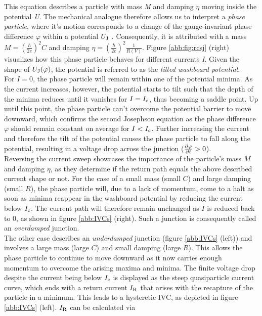 This equation describes a particle with mass \textit{M} and damping $\eta$ moving inside the potential \textit{U}. The mechanical analogue therefore allows us to interpret a \textit{phase particle}, where it's motion corresponds to a change of the gauge-invariant phase difference $\varphi$ within a potential $U_{\rm J}$ \cite{Clarke2004}. Consequently, it is attributed with a mass $M=\left(\frac{\hbar}{2 e}\right)^2C$ and damping $\eta=\left(\frac{\hbar}{2 e}\right)^2\frac{1}{R(V)}$. Figure \ref{abb:fig:rcsj} (right) visualizes how this phase particle behaves for different currents \textit{I}. Given the shape of $U_{\rm J}(\varphi)$, the potential is referred to as the \textit{tilted washboard potential}. \\
For $I=0$, the phase particle will remain within one of the potential minima. As the current increases, however, the potential starts to tilt such that the depth of the minima reduces until it vanishes for $I=I_{\rm c}$, thus becoming a saddle point. Up until this point, the phase particle can't overcome the potential barrier to move downward, which confirms the second Josephson equation as the phase difference $\varphi$ should remain constant on average for $I<I_{\rm c}$. Further increasing the current and therefore the tilt of the potential causes the phase particle to fall along the potential, resulting in a voltage drop across the junction ($\frac{\partial\varphi}{\partial t}>0$). \\

Reversing the current sweep showcases the importance of the particle's mass $M$ and damping $\eta$, as they determine if the return path equals the above described current shape or not. For the case of a small mass (small $C$) and large damping (small $R$), the phase particle will, due to a lack of momentum, come to a halt as soon as minima reappear in the washboard potential by reducing the current below $I_{\rm c}$. The current path will therefore remain unchanged as $I$ is reduced back to 0, as shown in figure \ref{abb:IVCs} (right). Such a junction is consequently called an \textit{overdamped} junction. \\
The other case describes an \textit{underdamped} junction (figure \ref{abb:IVCs} (left)) and involves a large mass (large $C$) and small damping (large $R$). This allows the phase particle to continue to move downward as it now carries enough momentum to overcome the arising maxima and minima. The finite voltage drop despite the current being below $I_{\rm c}$ is displayed as the steep quasiparticle current curve, which ends with a return current $I_{\rm R}$ that arises with the recapture of the particle in a minimum. This leads to a hysteretic IVC, as depicted in figure \ref{abb:IVCs} (left). $I_{\rm R}$ can be calculated via \cite{Likharev1986}

